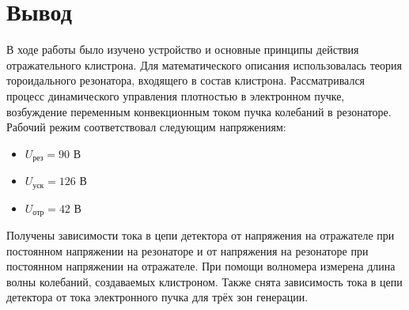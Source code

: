 \section{Вывод}

В ходе работы было изучено устройство и основные принципы действия отражательного клистрона. Для математического описания использовалась теория тороидального резонатора, входящего в состав клистрона. Рассматривался процесс динамического управления плотностью в электронном пучке, возбуждение переменным конвекционным током пучка колебаний в резонаторе. Рабочий режим соответствовал следующим напряжениям:
\begin{itemize}
	\item \(U_{\text{рез}} = 90\) В
	\item \(U_{\text{уск}} = 126\) В
	\item \(U_{\text{отр}} = 42\) В
\end{itemize}

Получены зависимости тока в цепи детектора от напряжения на отражателе при постоянном напряжении на резонаторе и от напряжения на резонаторе при постоянном напряжении на отражателе. При помощи волномера измерена длина волны колебаний, создаваемых клистроном. Также снята зависимость тока в цепи детектора от тока электронного пучка для трёх зон генерации.